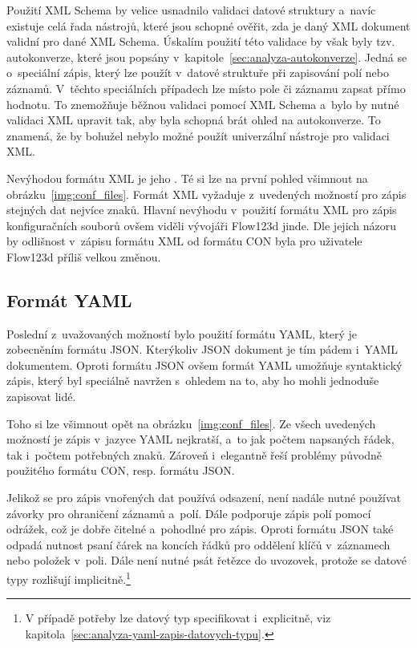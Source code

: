 \documentclass[FM,bw,DP]{tulthesis}
\begin{document}
Použití \gls{XML} Schema by velice usnadnilo validaci datové struktury a~navíc existuje celá řada nástrojů, které jsou schopné ověřit, zda je daný \gls{XML} dokument validní pro dané \gls{XML} Schema. Úskalím použití této validace by však byly tzv. autokonverze, které jsou popsány v~kapitole~\ref{sec:analyza-autokonverze}. Jedná se o~speciální zápis, který lze použít v~datové struktuře při zapisování polí nebo záznamů. V~těchto speciálních případech lze místo pole či záznamu zapsat přímo hodnotu. To znemožňuje běžnou validaci pomocí XML Schema a~bylo by nutné validaci \gls{XML} upravit tak, aby byla schopná brát ohled na autokonverze. To znamená, že by bohužel nebylo možné použít univerzální nástroje pro validaci \gls{XML}.

Nevýhodou formátu \gls{XML} je jeho . Té si lze na první pohled všimnout na obrázku~\ref{img:conf_files}. Formát \gls{XML} vyžaduje z~uvedených možností pro zápis stejných dat nejvíce znaků. Hlavní nevýhodu v~použití formátu \gls{XML} pro zápis konfiguračních souborů ovšem viděli vývojáři Flow123d jinde. Dle jejich názoru by odlišnost v~zápisu formátu \gls{XML} od formátu \gls{CON} byla pro uživatele Flow123d příliš velkou změnou.

\subsection{Formát YAML}
\label{sec:problematika-format-yaml}

Poslední z~uvažovaných možností bylo použití formátu \gls{YAML}, který je zobecněním formátu \gls{JSON}. Kterýkoliv \gls{JSON} dokument je tím pádem i~\gls{YAML} dokumentem. Oproti formátu \gls{JSON} ovšem formát \gls{YAML} umožňuje syntaktický zápis, který byl speciálně navržen s~ohledem na to, aby ho mohli jednoduše zapisovat lidé.

Toho si lze všimnout opět na obrázku~\ref{img:conf_files}. Ze všech uvedených možností je zápis v~jazyce YAML nejkratší, a~to jak počtem napsaných řádek, tak i~počtem potřebných znaků. Zároveň i~elegantně řeší problémy původně použitého formátu \gls{CON}, resp. formátu \gls{JSON}.

Jelikož se pro zápis vnořených dat používá odsazení, není nadále nutné používat závorky pro ohraničení záznamů a~polí. Dále podporuje zápis polí pomocí odrážek, což je dobře čitelné a~pohodlné pro zápis. Oproti formátu \gls{JSON} také odpadá nutnost psaní čárek na koncích řádků pro oddělení klíčů v~záznamech nebo položek v~poli. Dále není nutné psát řetězce do uvozovek, protože se datové typy rozlišují implicitně.\footnote{V případě potřeby lze datový typ specifikovat i~explicitně, viz kapitola~\ref{sec:analyza-yaml-zapis-datovych-typu}.}
\end{document}
